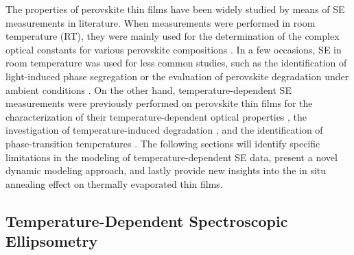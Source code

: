 The properties of perovskite thin films have been widely studied by means of SE measurements in literature. When measurements were performed in room temperature (RT), they were mainly used for the determination of the complex optical constants for various perovskite compositions \cite{Yan2020DeterminationFilms, Zhao2018EllipsometricFilm, Loper2015ComplexSpectrophotometry, Yuan2021Moisture-stimulatedProperties}. In a few occasions, SE in room temperature was used for less common studies, such as the identification of light-induced phase segregation \cite{Bernhardt2022InPerovskites} or the evaluation of perovskite degradation under ambient conditions \cite{Marronnier2018ElectricalConditions}. On the other hand, temperature-dependent SE measurements were previously performed on perovskite thin films for the characterization of their temperature-dependent optical properties \cite{Jiang2016TemperatureEllipsometry, Chen2019CharacterizingEllipsometry}, the investigation of temperature-induced degradation \cite{Tejada2022HybridInfrared, Wang2019InEllipsometry}, and the identification of phase-transition temperatures \cite{Yuan2020InPortfolio, Yuan2021Moisture-stimulatedProperties}. The following sections will identify specific limitations in the modeling of temperature-dependent SE data, present a novel dynamic modeling approach, and lastly provide new insights into the in situ annealing effect on thermally evaporated  thin films.  


\subsection{Temperature-Dependent Spectroscopic Ellipsometry}



